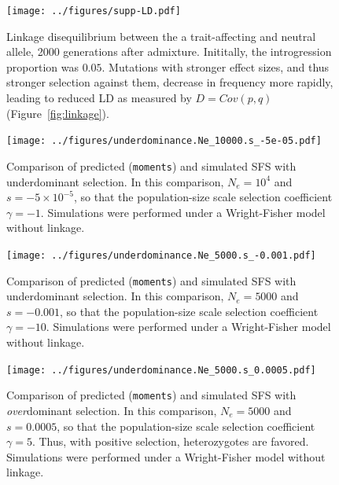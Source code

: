 \documentclass[]{article}
\newcommand{\moments}{\texttt{moments}\xspace}
\begin{document}
\begin{figure}[ht!]
    \centering
    \texttt{[image: ../figures/supp-LD.pdf]}
    \caption{
        Linkage disequilibrium between the a trait-affecting and neutral allele, 
        2000 generations after admixture. Inititally, the introgression proportion
        was $0.05$. Mutations with stronger effect sizes, and thus stronger selection
        against them, decrease in frequency more rapidly, leading to reduced LD
        as measured by $D=Cov(p,q)$ (Figure~\ref{fig:linkage}).
    }
    \label{fig:supp-LD}
\end{figure}

\begin{figure}[ht!]
    \centering
    \texttt{[image: ../figures/underdominance.Ne\_10000.s\_-5e-05.pdf]}
    \caption{
        Comparison of predicted (\moments) and simulated SFS with underdominant
        selection. In this comparison, $N_e=10^4$ and $s=-5\times10^{-5}$, so that
        the population-size scale selection coefficient $\gamma=-1$.
        Simulations were performed under a Wright-Fisher model without linkage.
    }
    \label{fig:underdominance-validation-small-s}
\end{figure}

\begin{figure}[ht!]
    \centering
    \texttt{[image: ../figures/underdominance.Ne\_5000.s\_-0.001.pdf]}
    \caption{
        Comparison of predicted (\moments) and simulated SFS with underdominant
        selection. In this comparison, $N_e=5000$ and $s=-0.001$, so that
        the population-size scale selection coefficient $\gamma=-10$.
        Simulations were performed under a Wright-Fisher model without linkage.
    }
    \label{fig:underdominance-validation-large-s}
\end{figure}

\begin{figure}[ht!]
    \centering
    \texttt{[image: ../figures/underdominance.Ne\_5000.s\_0.0005.pdf]}
    \caption{
        Comparison of predicted (\moments) and simulated SFS with \emph{over}dominant
        selection. In this comparison, $N_e=5000$ and $s=0.0005$, so that
        the population-size scale selection coefficient $\gamma=5$.
        Thus, with positive selection, heterozygotes are favored.
        Simulations were performed under a Wright-Fisher model without linkage.
    }
    \label{fig:overdominance-validation}
\end{figure}
\end{document}
